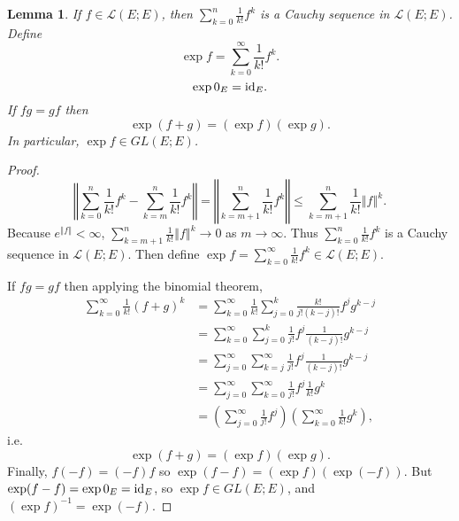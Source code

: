 \documentclass{article}
\newcommand{\id}{\ensuremath\mathrm{id}}
\newcommand{\norm}[1]{\left\Vert #1 \right\Vert}
\newtheorem{lemma}[theorem]{Lemma}
\theoremstyle{definition}
\begin{document}
\begin{lemma}
If $f \in \mathscr{L}(E;E)$, then $\sum_{k=0}^n \frac{1}{k!} f^k$ is a Cauchy sequence in $\mathscr{L}(E;E)$. Define
\[
\exp f = \sum_{k=0}^\infty \frac{1}{k!} f^k.
\] 
\[
\exp 0_E=\id_E.
\]
If $fg=gf$ then
\[
\exp(f+g)=(\exp f)(\exp g).
\]
In particular, $\exp f \in GL(E;E)$. 
\end{lemma}
\begin{proof}
\[
\norm{\sum_{k=0}^n \frac{1}{k!} f^k-\sum_{k=m}^n \frac{1}{k!} f^k}
=\norm{\sum_{k=m+1}^n \frac{1}{k!} f^k}
\leq \sum_{k=m+1}^n \frac{1}{k!} \norm{f}^k.
\]
Because $e^{\norm{f}}<\infty$, $\sum_{k=m+1}^n \frac{1}{k!} \norm{f}^k \to 0$ as $m \to \infty$. 
Thus 
$\sum_{k=0}^n \frac{1}{k!} f^k$ is a Cauchy sequence in $\mathscr{L}(E;E)$.
Then define $\exp f = \sum_{k=0}^\infty \frac{1}{k!} f^k \in \mathscr{L}(E;E)$.

If $fg=gf$ then applying the binomial theorem,
\begin{align*}
\sum_{k=0}^\infty \frac{1}{k!} (f+g)^k&=\sum_{k=0}^\infty \frac{1}{k!} \sum_{j=0}^k \frac{k!}{j!(k-j)!} f^j g^{k-j}\\
&=\sum_{k=0}^\infty \sum_{j=0}^k \frac{1}{j!} f^j \frac{1}{(k-j)!} g^{k-j}\\
&=\sum_{j=0}^\infty \sum_{k=j}^\infty \frac{1}{j!} f^j \frac{1}{(k-j)!} g^{k-j}\\
&=\sum_{j=0}^\infty \sum_{k=0}^\infty \frac{1}{j!} f^j  \frac{1}{k!} g^k \\
&=\left(\sum_{j=0}^\infty  \frac{1}{j!} f^j\right) \left( \sum_{k=0}^\infty \frac{1}{k!} g^k\right),
\end{align*}
i.e.
\[
\exp(f+g) = (\exp f)(\exp g).
\]
Finally, $f(-f)=(-f)f$ so $\exp(f-f)=(\exp f)(\exp (-f))$. But $\exp(f-f)=\exp 0_E=\id_E$, so $\exp f \in GL(E;E)$, and
$(\exp f)^{-1} = \exp(-f)$. 
\end{proof}
\end{document}
